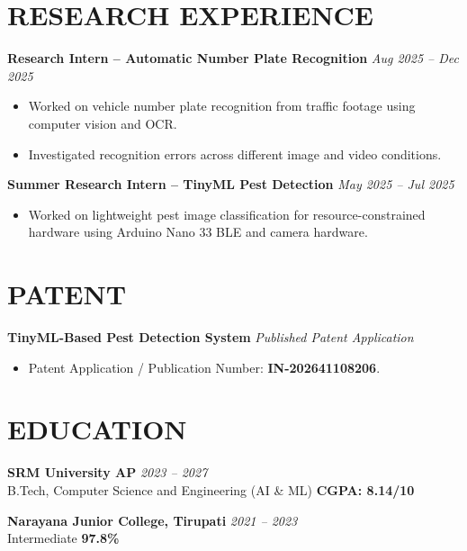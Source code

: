 \documentclass[a4paper,10pt]{article}
\begin{document}
\section*{RESEARCH EXPERIENCE}

\textbf{Research Intern -- Automatic Number Plate Recognition}
\hfill
\textit{Aug 2025 -- Dec 2025}

\begin{itemize}
    \item Worked on vehicle number plate recognition
    from traffic footage using computer vision and OCR.
    \item Investigated recognition errors across different
    image and video conditions.
\end{itemize}

\textbf{Summer Research Intern -- TinyML Pest Detection}
\hfill
\textit{May 2025 -- Jul 2025}

\begin{itemize}
    \item Worked on lightweight pest image classification
    for resource-constrained hardware using Arduino
    Nano 33 BLE and camera hardware.
\end{itemize}

\section*{PATENT}

\textbf{TinyML-Based Pest Detection System}
\hfill
\textit{Published Patent Application}

\begin{itemize}
    \item Patent Application / Publication Number:
    \textbf{IN-202641108206}.
\end{itemize}

\section*{EDUCATION}

\textbf{SRM University AP}
\hfill
\textit{2023 -- 2027}\\
B.Tech, Computer Science and Engineering (AI \& ML)
\hfill
\textbf{CGPA: 8.14/10}

\textbf{Narayana Junior College, Tirupati}
\hfill
\textit{2021 -- 2023}\\
Intermediate
\hfill
\textbf{97.8\%}
\end{document}
